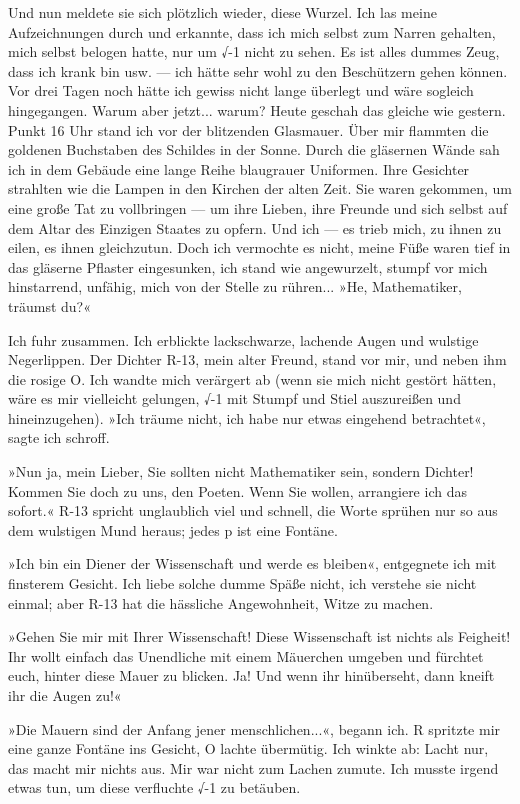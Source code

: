 Und nun meldete sie sich plötzlich wieder, diese Wurzel. Ich las
meine Aufzeichnungen durch und erkannte, dass ich mich selbst zum
Narren gehalten, mich selbst belogen hatte, nur um √-1 nicht zu
sehen. Es ist alles dummes Zeug, dass ich krank bin usw. — ich
hätte sehr wohl zu den Beschützern gehen können. Vor drei Tagen
noch hätte ich gewiss nicht lange überlegt und wäre sogleich
hingegangen. Warum aber jetzt... warum? Heute geschah das gleiche
wie gestern. Punkt 16 Uhr stand ich vor der blitzenden Glasmauer.
Über mir flammten die goldenen Buchstaben des Schildes in der
Sonne. Durch die gläsernen Wände sah ich in dem Gebäude eine lange
Reihe blaugrauer Uniformen. Ihre Gesichter strahlten wie die Lampen
in den Kirchen der alten Zeit. Sie waren gekommen, um eine große
Tat zu vollbringen — um ihre Lieben, ihre Freunde und sich selbst
auf dem Altar des Einzigen Staates zu opfern. Und ich — es trieb
mich, zu ihnen zu eilen, es ihnen gleichzutun. Doch ich vermochte
es nicht, meine Füße waren tief in das gläserne Pflaster
eingesunken, ich stand wie angewurzelt, stumpf vor mich
hinstarrend, unfähig, mich von der Stelle zu rühren... »He,
Mathematiker, träumst du?«

Ich fuhr zusammen. Ich erblickte lackschwarze, lachende Augen und
wulstige Negerlippen. Der Dichter R-13, mein alter Freund, stand
vor mir, und neben ihm die rosige O. Ich wandte mich verärgert ab
(wenn sie mich nicht gestört hätten, wäre es mir vielleicht
gelungen, √-1 mit Stumpf und Stiel auszureißen und hineinzugehen).
»Ich träume nicht, ich habe nur etwas eingehend betrachtet«, sagte
ich schroff.

»Nun ja, mein Lieber, Sie sollten nicht Mathematiker sein, sondern
Dichter! Kommen Sie doch zu uns, den Poeten. Wenn Sie wollen,
arrangiere ich das sofort.« R-13 spricht unglaublich viel und
schnell, die Worte sprühen nur so aus dem wulstigen Mund heraus;
jedes p ist eine Fontäne.

»Ich bin ein Diener der Wissenschaft und werde es bleiben«,
entgegnete ich mit finsterem Gesicht. Ich liebe solche dumme Späße
nicht, ich verstehe sie nicht einmal; aber R-13 hat die hässliche
Angewohnheit, Witze zu machen.

»Gehen Sie mir mit Ihrer Wissenschaft! Diese Wissenschaft ist
nichts als Feigheit! Ihr wollt einfach das Unendliche mit einem
Mäuerchen umgeben und fürchtet euch, hinter diese Mauer zu blicken.
Ja! Und wenn ihr hinüberseht, dann kneift ihr die Augen zu!«

»Die Mauern sind der Anfang jener menschlichen...«, begann ich. R
spritzte mir eine ganze Fontäne ins Gesicht, O lachte übermütig.
Ich winkte ab: Lacht nur, das macht mir nichts aus. Mir war nicht
zum Lachen zumute. Ich musste irgend etwas tun, um diese verfluchte
√-1 zu betäuben.

